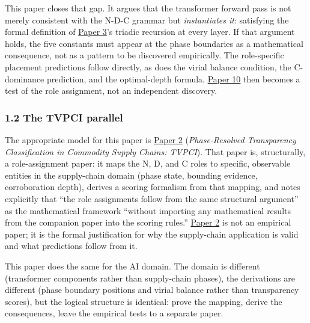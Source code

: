 \documentclass[
  11pt,
  letterpaper,
]{article}
\begin{document}
This paper closes that gap. It argues that the transformer forward pass
is not merely consistent with the N-D-C grammar but \emph{instantiates
it}: satisfying the formal definition of
\href{https://github.com/baardev/truevalue/blob/main/docnav/Research/papers/3_minimal-recursive-triadic-framework/3_minimal-recursive-triadic-framework.pdf}{Paper
3}'s triadic recursion at every layer. If that argument holds, the five
constants must appear at the phase boundaries as a mathematical
consequence, not as a pattern to be discovered empirically. The
role-specific placement predictions follow directly, as does the virial
balance condition, the C-dominance prediction, and the optimal-depth
formula.
\href{https://github.com/baardev/truevalue/blob/main/docnav/Research/papers/10_tholonic-neural-architecture/10_tholonic-neural-architecture.pdf}{Paper
10} then becomes a test of the role assignment, not an independent
discovery.

\subsubsection{1.2 The TVPCI parallel}\label{the-tvpci-parallel}

The appropriate model for this paper is
\href{https://github.com/baardev/truevalue/blob/main/docnav/Research/papers/2_supply-chain-transparency-tvpci/2_supply-chain-transparency-tvpci.pdf}{Paper
2} (\emph{Phase-Resolved Transparency Classification in Commodity Supply
Chains: TVPCI}). That paper is, structurally, a role-assignment paper:
it maps the N, D, and C roles to specific, observable entities in the
supply-chain domain (phase state, bounding evidence, corroboration
depth), derives a scoring formalism from that mapping, and notes
explicitly that ``the role assignments follow from the same structural
argument'' as the mathematical framework ``without importing any
mathematical results from the companion paper into the scoring rules.''
\href{https://github.com/baardev/truevalue/blob/main/docnav/Research/papers/2_supply-chain-transparency-tvpci/2_supply-chain-transparency-tvpci.pdf}{Paper
2} is not an empirical paper; it is the formal justification for why the
supply-chain application is valid and what predictions follow from it.

This paper does the same for the AI domain. The domain is different
(transformer components rather than supply-chain phases), the
derivations are different (phase boundary positions and virial balance
rather than transparency scores), but the logical structure is
identical: prove the mapping, derive the consequences, leave the
empirical tests to a separate paper.
\end{document}
